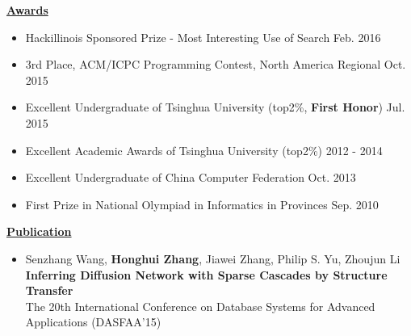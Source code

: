 \documentclass[11pt]{article}
\begin{document}
\begin{CJK}{GBK}{kai}
{ \textbf{\underline{Awards}}}\\
\begin{itemize}
\item Hackillinois Sponsored Prize - Most Interesting Use of Search \hfill Feb. 2016
\item 3rd Place, ACM/ICPC Programming Contest, North America Regional \hfill Oct. 2015
\item Excellent Undergraduate of Tsinghua University (top2\%, \textbf{First Honor}) \hfill Jul. 2015
\item Excellent Academic Awards of Tsinghua University (top2\%) \hfill 2012 - 2014
\item Excellent Undergraduate of China Computer Federation \hfill Oct. 2013
\item First Prize in National Olympiad in Informatics in Provinces \hfill Sep. 2010
\end{itemize}

\bigskip

{ \textbf{\underline{Publication}}}
\begin{itemize}
    \item Senzhang Wang, \textbf{Honghui Zhang}, Jiawei Zhang, Philip S. Yu, Zhoujun Li \\ \textbf{Inferring Diffusion Network with Sparse Cascades by Structure Transfer}\\ The 20th International Conference on Database Systems for Advanced Applications (DASFAA’15)
\end{itemize}

\end{CJK}
\end{document}
